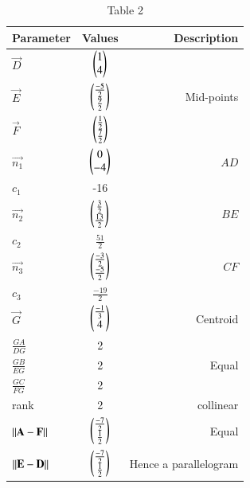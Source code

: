 \documentclass[journal,12pt,twocolumn]{IEEEtran}
\theoremstyle{remark}
\begin{document}
\begin{table}[h!]
 \begin{center}
  \caption{Table 2}
  \label{tab: table2}
\begin{tabular}{|l|c|r|}
    \hline
    Parameter & Values & Description\\
    \hline
    $\vec D$ & $\begin{pmatrix}1\\4\\\end{pmatrix}$ & {}\\
    $\vec E$ & $\begin{pmatrix}\frac{-5}{2}\\\frac{9}{2}\\\end{pmatrix}$ & Mid-points\\
    $\vec F$ & $\begin{pmatrix}\frac{1}{2}\\\frac{7}{2}\\\end{pmatrix}$ & {}\\
    \hline
    $\vec {n_1}$ & $\begin{pmatrix}0\\-4\\\end{pmatrix}$ & $AD$\\
    ${c_1}$ & -16 & {}\\
    $\vec {n_2}$ & $\begin{pmatrix}\frac{3}{2}\\\frac{13}{2}\\\end{pmatrix}$ & $BE$\\
    ${c_2}$ & $\frac{51}{2}$ & {}\\
    $\vec {n_3}$ & $\begin{pmatrix}\frac{-3}{2}\\\frac{-5}{2}\\\end{pmatrix}$ & $CF$\\
    ${c_3}$ & $\frac{-19}{2}$ & {}\\
    \hline
    $\vec G$ & $\begin{pmatrix}\frac{-1}{3}\\4\\\end{pmatrix}$ & Centroid\\
    \hline
    $\frac{GA}{DG}$ & 2 & {}\\
    $\frac{GB}{EG}$ & 2 & Equal\\
    $\frac{GC}{FG}$ & 2 & {}\\
    \hline
    rank & 2 & collinear\\
    \hline
    $\left\lVert\mathbf{A}-\mathbf{F}\right\rVert$ & $\begin{pmatrix}\frac{-7}{2}\\\frac{1}{2}\\\end{pmatrix}$ & Equal\\
    $\left\lVert\mathbf{E}-\mathbf{D}\right\rVert$ & $\begin{pmatrix}\frac{-7}{2}\\\frac{1}{2}\\\end{pmatrix}$ & Hence a parallelogram\\
    \hline
\end{tabular}
\end{center}
\end{table}
\end{document}
